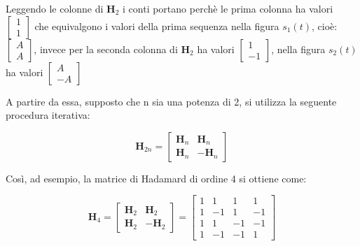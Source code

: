 \begin{tcolorbox}
    Leggendo le colonne di $\textbf{H}_2 $ i conti portano perchè le prima colonna ha valori 
    $\begin{bmatrix}
        1 \\
        1
    \end{bmatrix}$
    che equivalgono i valori della prima sequenza nella figura $s_1 (t)$, cioè: 
    $\begin{bmatrix}
        A \\
        A
    \end{bmatrix}
    $, invece per la seconda colonna di $\textbf{H}_2 $ ha valori 
    $\begin{bmatrix}
        1 \\
        -1
    \end{bmatrix}
    $, nella figura $s_2 (t)$ ha valori 
    $\begin{bmatrix}
        A \\
        -A
    \end{bmatrix}
    $
\end{tcolorbox}

A partire da essa, supposto che n sia una potenza di 2, si utilizza la seguente procedura iterativa: 

{
    \Large 
    \begin{equation}
        \textbf{H}_{2n}
        = 
        \begin{bmatrix}
            \textbf{H}_{n} & \textbf{H}_{n} \\
            \textbf{H}_{n} & - \textbf{H}_{n}
        \end{bmatrix}
    \end{equation}
}

Così, ad esempio, la matrice di Hadamard di ordine 4 si ottiene come: 

{
    \Large 
    \begin{equation}
          \textbf{H}_{4}
        = 
        \begin{bmatrix}
            \textbf{H}_{2} & \textbf{H}_{2} \\
            \textbf{H}_{2} & - \textbf{H}_{2}
        \end{bmatrix}
        =
        \begin{bmatrix}
            1 & 1 & 1 & 1 \\
            1 & -1 & 1 & -1 \\
            1 & 1 & -1 & -1 \\
            1 & -1 & -1 & 1 
        \end{bmatrix}
    \end{equation}
}


